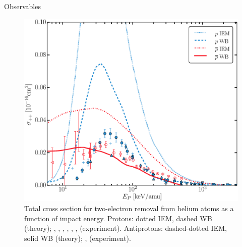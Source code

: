 \documentclass[letterpaper, 12 pt]{report}
\begin{document}
\begin{chapter}{Observables \label{chap:p-he2p-he}}
\begin{figure}[htp]
   \centering
   \includegraphics[width = \linewidth]{./images/pbarhe/pbarhe-++.eps}
   \caption[Total cross section for two-electron removal from helium atoms as a function of impact
            energy]{Total cross section for two-electron removal from helium atoms as a function
            of impact energy. Protons: dotted IEM, dashed WB (theory); {\color{blue}{$\blacktriangle$}}
            \cite{DTR84}, {\color{blue}{$+$}} \cite{Sol62}, {\color{blue}{$\bullet$}} \cite{SG89},
            {\color{blue}{$\blacklozenge$}} \cite{SG85}, {\color{blue}{$\blacktriangleright$}}
            \cite{PM70}, {\color{blue}{$\blacktriangledown$}} \cite{Wex64},
            {\color{blue}{$\blacksquare$}} \cite{KAH84} (experiment).
            Antiprotons: dashed-dotted IEM, solid WB (theory); {\color{red}{$\circ$}} \cite{HKM94},
            {\color{red}{$\triangleleft$}} \cite{KKT09} (experiment). \label{fig:he++}}
\end{figure}


\end{chapter}
\end{document}
